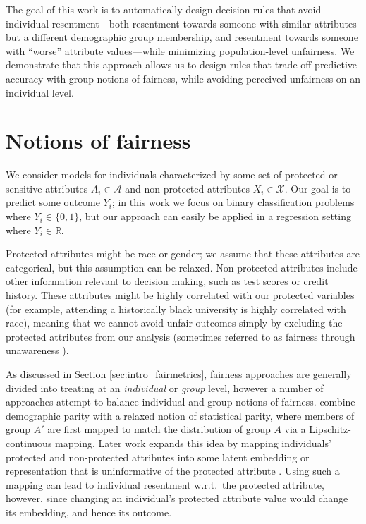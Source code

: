     The goal of this work is to automatically design decision rules that avoid individual resentment---both resentment towards someone with similar attributes but a different demographic group membership, and resentment towards someone with ``worse'' attribute values---while minimizing population-level unfairness. We demonstrate that this approach allows us to design rules that trade off predictive accuracy with group notions of fairness, while avoiding perceived unfairness on an individual level.

\section{Notions of fairness}\label{sec:bg}
    \label{sec:monofair_background}
    
    We consider models for individuals characterized by some set of protected or sensitive attributes $A_i \in \mathcal{A}$ and non-protected attributes $X_i \in \mathcal{X}$. Our goal is to predict some outcome $Y_i$; in this work we focus on binary classification problems where $Y_i \in \{0, 1\}$, but our approach can easily be applied in a regression setting where $Y_i\in \mathbb{R}$.

    Protected attributes might be race or gender; we assume that these attributes are categorical, but this assumption can be relaxed. Non-protected attributes include other information relevant to decision making, such as test scores or credit history. These attributes might be highly correlated with our protected variables (for example, attending a historically black university is highly correlated with race), meaning that we cannot avoid unfair outcomes simply by excluding the protected attributes from our analysis (sometimes referred to as fairness through unawareness \citep{dwork2012fairness}).
    
    As discussed in Section \ref{sec:intro_fairmetrics}, fairness approaches are generally divided into treating at an \emph{individual} or \emph{group} level, however a number of approaches attempt to balance individual and group notions of fairness.  \cite{dwork2012fairness} combine demographic parity with a relaxed notion of statistical parity, where members of group $A'$ are first mapped to match the distribution of group $A$ via a Lipschitz-continuous mapping. Later work expands this idea by mapping individuals' protected and non-protected attributes into some latent embedding or representation that is uninformative of the protected attribute \citep{ZemQiSwePitDwo2013,MadCrePitZem2018}. Using such a mapping can lead to individual resentment w.r.t.\ the protected attribute, however,  since changing an individual's protected attribute value would change its embedding, and hence its outcome.
    

